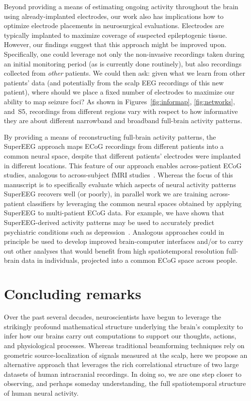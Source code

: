 \documentclass[11pt]{article}
\newcommand{\networkpower}{S5}
\begin{document}
Beyond providing a means of estimating ongoing activity throughout the brain
using already-implanted electrodes, our work also has implications how to
optimize electrode placements in neurosurgical evaluations. Electrodes are
typically implanted to maximize coverage of suspected epileptogenic tissue.
However, our findings suggest that this approach might be improved upon.
Specifically, one could leverage not only the non-invasive recordings taken
during an initial monitoring period (as is currently done routinely), but also
recordings collected from \textit{other} patients.  We could then ask: given
what we learn from other patients' data (and potentially from the scalp EEG
recordings of this new patient), where should we place a fixed number of
electrodes to maximize our ability to map seizure foci?  As shown in
Figures~\ref{fig:informap}, \ref{fig:networks}, and~\networkpower, recordings
from different regions vary with respect to how informative they are about
different narrowband and broadband full-brain activity patterns.

By providing a means of reconstructing full-brain activity patterns, the
SuperEEG approach maps ECoG recordings from different patients into a common
neural space, despite that different patients' electrodes were implanted in
different locations. This feature of our approach enables across-patient ECoG
studies, analogous to across-subject fMRI studies~\citep[e.g.,][]{HaxbEtal01,
NormEtal06, HaxbEtal11}. Whereas the focus of this manuscript is to specifically
evaluate which aspects of neural activity patterns SuperEEG recovers well (or
poorly), in parallel work we are training across-patient classifiers by
leveraging the common neural spaces obtained by applying SuperEEG to
multi-patient ECoG data.  For example, we have shown that SuperEEG-derived
activity patterns may be used to accurately predict psychiatric conditions such
as depression~\citep{ScanEtal20}.  Analogous approaches could in principle be
used to develop improved brain-computer interfaces and/or to carry out other
analyses that would benefit from high spatiotemporal resolution full-brain data
in individuals, projected into a common ECoG space across people.


\section*{Concluding remarks}
Over the past several decades, neuroscientists
have begun to leverage the strikingly profound mathematical structure underlying
the brain's complexity to infer how our brains carry out computations to support
our thoughts, actions, and physiological processes.  Whereas traditional
beamforming techniques rely on geometric source-localization of signals measured
at the scalp, here we propose an alternative approach that leverages the rich
correlational structure of two large datasets of human intracranial recordings.
In doing so, we are one step closer to observing, and perhaps someday
understanding, the full spatiotemporal structure of human neural activity.
\end{document}
